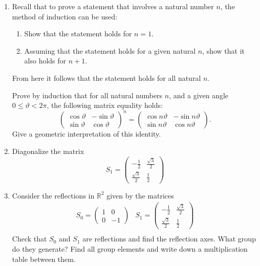\documentclass[12pt]{article}
\theoremstyle{plain}
\theoremstyle{definition}
\theoremstyle{remark}
\newcommand{\R}{\mathbb{R}}
\begin{document}
\begin{enumerate}
\item Recall that to prove a statement that involves a natural number $n$, the method of induction can be used: 
\begin{enumerate} 
\item Show that the statement holds for $n =1$. 
\item Assuming that the statement holds for a given natural $n$, show that it also holds for $n+1$. 
\end{enumerate} 
From here it follows that the statement holds for all natural $n$.  


Prove by induction that for all natural numbers $n$, and a given angle $0 \leq \vartheta < 2 \pi$, the following matrix equality holds: 
\[ \left( \begin{array}{cc}  
        \cos{\vartheta}  &  - \sin{\vartheta} \\ 
        \sin{\vartheta}   &    \cos{\vartheta}   \end{array} \right)^n  = 
        \left( \begin{array}{cc} 
        \cos{n \vartheta} & - \sin{n \vartheta} \\ 
        \sin{n \vartheta}  &   \cos{n \vartheta}  \end{array}  \right)  . \] 
Give a geometric interpretation of this identity. 

\item Diagonalize the matrix
\[ 
S_1 = 
\left( 
\begin{array}{cc}  
-\frac{1}{2} & \frac{\sqrt{3}}{2} \\ 
\frac{\sqrt{3}}{2} & \frac{1}{2}  
\end{array} 
\right)  
\] 


\item Consider the reflections in $\R^2$ given by the matrices 
\[ \begin{array}{cc} S_0 = \left( \begin{array}{cc} 
               1  & 0  \\ 
              0   & -1 \end{array} 
            \right)       &  
            S_1 = \left( \begin{array}{cc}  
            -\frac{1}{2} & \frac{\sqrt{3}}{2} \\ 
            \frac{\sqrt{3}}{2} & \frac{1}{2}  \end{array} 
            \right)  \\  \end{array}  \] 
Check that  $S_0$ and $S_1$ are reflections and find the reflection axes. What group do they generate? 
Find all group elements and write down a multiplication table between them. 


\end{enumerate}
\end{document}
